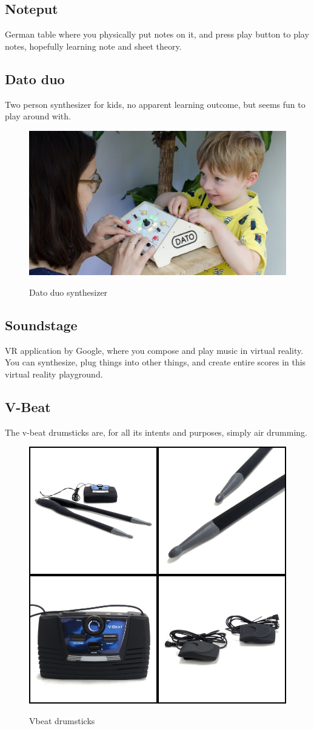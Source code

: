 	\subsection{Noteput}
		German table where you physically put notes on it, and press play button to play notes, hopefully learning note and sheet theory.
	\subsection{Dato duo}
		Two person synthesizer for kids, no apparent learning outcome, but seems fun to play around with.
		\begin{figure}[H]
			\centering
			\includegraphics[width=0.7\linewidth]{figure/Analysis/datoduo}
			\label{fig:datoduo}
			\caption{Dato duo synthesizer}
		\end{figure}
	\subsection{Soundstage}
		VR application by Google, where you compose and play music in virtual reality. You can synthesize, plug things into other things, and create entire scores in this virtual reality playground.
		
	\subsection{V-Beat}
		The v-beat drumsticks are, for all its intents and purposes, simply air drumming.
		\begin{figure}[H]
			\centering
			\includegraphics[width=0.5\linewidth]{figure/Analysis/vbeat}
			\label{fig:vbeat}
			\caption{Vbeat drumsticks}
		\end{figure}
		

